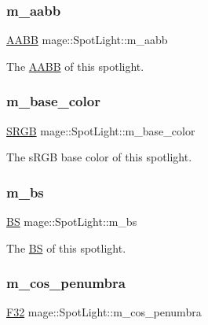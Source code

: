 \subsubsection{\texorpdfstring{m\+\_\+aabb}{m\_aabb}}
{\footnotesize\ttfamily \hyperlink{classmage_1_1_a_a_b_b}{A\+A\+BB} mage\+::\+Spot\+Light\+::m\+\_\+aabb\hspace{0.3cm}{\ttfamily [private]}}

The \hyperlink{classmage_1_1_a_a_b_b}{A\+A\+BB} of this spotlight. \hypertarget{classmage_1_1_spot_light_af61462cf792ad5c713af8d849fa17309}{}\label{classmage_1_1_spot_light_af61462cf792ad5c713af8d849fa17309} 
\subsubsection{\texorpdfstring{m\+\_\+base\+\_\+color}{m\_base\_color}}
{\footnotesize\ttfamily \hyperlink{structmage_1_1_s_r_g_b}{S\+R\+GB} mage\+::\+Spot\+Light\+::m\+\_\+base\+\_\+color\hspace{0.3cm}{\ttfamily [private]}}

The s\+R\+GB base color of this spotlight. \hypertarget{classmage_1_1_spot_light_ab1adda3579072bff80041b422f7eed19}{}\label{classmage_1_1_spot_light_ab1adda3579072bff80041b422f7eed19} 
\subsubsection{\texorpdfstring{m\+\_\+bs}{m\_bs}}
{\footnotesize\ttfamily \hyperlink{classmage_1_1_b_s}{BS} mage\+::\+Spot\+Light\+::m\+\_\+bs\hspace{0.3cm}{\ttfamily [private]}}

The \hyperlink{classmage_1_1_b_s}{BS} of this spotlight. \hypertarget{classmage_1_1_spot_light_ac4448bbc1c8a924141d2798c3365047a}{}\label{classmage_1_1_spot_light_ac4448bbc1c8a924141d2798c3365047a} 
\subsubsection{\texorpdfstring{m\+\_\+cos\+\_\+penumbra}{m\_cos\_penumbra}}
{\footnotesize\ttfamily \hyperlink{namespacemage_aa97e833b45f06d60a0a9c4fc22ae02c0}{F32} mage\+::\+Spot\+Light\+::m\+\_\+cos\+\_\+penumbra\hspace{0.3cm}{\ttfamily [private]}}


